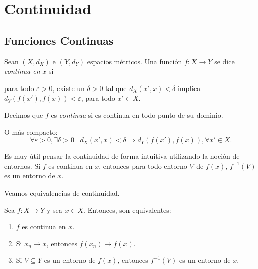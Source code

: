 \chapter{Continuidad}

\section{Funciones Continuas}

\begin{definition}
	Sean $(X, d_X)$ e $(Y, d_Y)$ espacios métricos. Una función $f : X \to Y$ se dice \emph{continua en} $x$ si
	\begin{center}
		\begin{minipage}{0.9\linewidth}
			para todo $\varepsilon > 0$, existe un $\delta > 0$ tal que $d_X (x', x) < \delta$ implica $d_Y (f(x'), f(x)) < \varepsilon$, para todo $x' \in X$.
		\end{minipage}
	\end{center}
	Decimos que $f$ es \emph{continua} si es continua en todo punto de su dominio.
\end{definition}

\begin{remark}
	O más compacto:
	\begin{equation*}
		\forall \varepsilon > 0, \exists \delta > 0 \mid d_X (x', x) < \delta \Rightarrow d_Y (f(x'), f(x)), \forall x' \in X.
	\end{equation*}
\end{remark}

Es muy útil pensar la continuidad de forma intuitiva utilizando la noción de entornos. Si $f$ es continua en $x$, entonces para todo entorno $V$ de $f(x)$, $f^{-1}(V)$ es un entorno de $x$.

\begin{center}
	
\end{center}

Veamos equivalencias de continuidad.

\begin{proposition}
	Sea $f : X \to Y$ y sea $x \in X$. Entonces, son equivalentes:
	\begin{enumerate}
		\item $f$ es continua en $x$.
		\item Si $x_n \longrightarrow x$, entonces $f(x_n) \longrightarrow f(x)$.
		\item Si $V \subseteq Y$ es un entorno de $f(x)$, entonces $f^{-1} (V)$ es un entorno de $x$.
	\end{enumerate}
\end{proposition}

